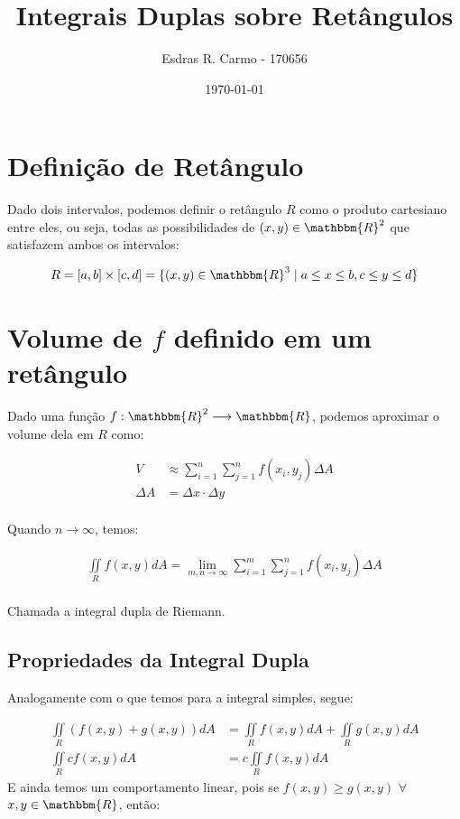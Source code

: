\documentclass{article}
\author{Esdras R. Carmo - 170656}
\title{Integrais Duplas sobre Retângulos}
\date{\today}
\newcommand{\doubleint}[1] {\iint\limits_R #1 dA}
\theoremstyle{definition}
\begin{document}
    \maketitle
   
    \section{Definição de Retângulo}
        Dado dois intervalos, podemos definir o retângulo $R$ como o produto cartesiano
        entre eles, ou seja, todas as possibilidades de $(x, y) \in \mathbbm{R}^2$
        que satisfazem ambos os intervalos:

        \begin{align*}
            R = [a, b] \times [c, d] = \{(x, y) \in \mathbbm{R}^3 \mid a \leq x \leq b, c \leq y \leq d\}
        \end{align*}

    \section{Volume de $f$ definido em um retângulo}
        Dado uma função $f: \mathbbm{R}^2 \longrightarrow \mathbbm{R}$, podemos aproximar
        o volume dela em $R$ como:

        \begin{align*}
            V &\approx \sum_{i=1}^n \sum_{j=1}^n f(x_i, y_j) \Delta A\\
            \Delta A &= \Delta x \cdot \Delta y\\
        \end{align*}

        Quando $n \to \infty$, temos:

        \begin{align*}
            \doubleint{f(x,y)} = \lim_{m,n \to \infty} \sum_{i=1}^m \sum_{j=1}^n f(x_i, y_j) \Delta A\\
        \end{align*}

        Chamada a integral dupla de Riemann.

        \subsection{Propriedades da Integral Dupla}
            Analogamente com o que temos para a integral simples, segue:

            \begin{align*}
                \doubleint{(f(x,y) + g(x, y))} &= \doubleint{f(x, y)} + \doubleint{g(x, y)}\\
                \doubleint{c f(x, y)} &= c \doubleint{f(x, y)}
            \end{align*}
            E ainda temos um comportamento linear, pois se $f(x, y) \geq g(x, y)$ $\forall$ $x, y \in \mathbbm{R}$, então:
\end{document}
